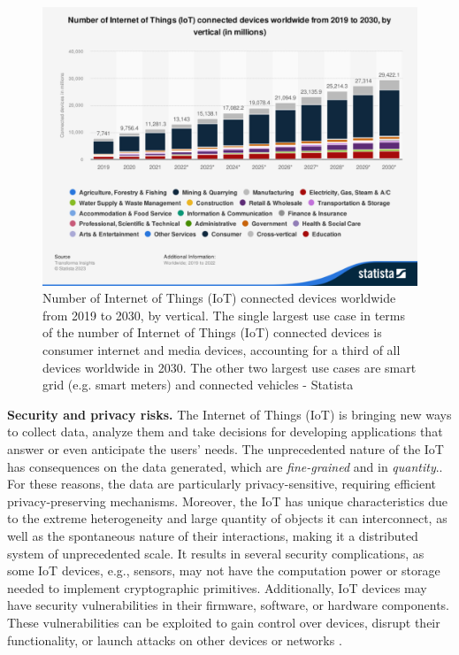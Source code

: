 \begin{figure}[t]
\centering
 \includegraphics[scale=0.4]{Images/devices_forecast.pdf}
\caption[Number of Internet of Things (IoT) connected devices worldwide from 2019 to 2030, by vertical]{Number of Internet of Things (IoT) connected devices worldwide from 2019 to 2030, by vertical. The single largest use case in terms of the number of Internet of Things (IoT) connected devices is consumer internet and media devices, accounting for a third of all devices worldwide in 2030. The other two largest use cases are smart grid (e.g. smart meters) and connected vehicles - Statista \cite{StatistaIoT2023}}
\label{F_devices_forecast}
\end{figure} 
\textbf{Security and privacy risks.}
The Internet of Things (IoT) is bringing new ways to collect data, analyze them and take decisions
for developing applications that answer or even anticipate the users’ needs. The unprecedented nature of the IoT has consequences on the data generated, which are \emph{fine-grained} and in \emph{quantity}.. For these reasons, the data are particularly
privacy-sensitive, requiring efficient privacy-preserving mechanisms. Moreover, the IoT has unique
characteristics due to the extreme heterogeneity and large quantity of objects it can interconnect, as
well as the spontaneous nature of their interactions, making it a distributed system of unprecedented
scale. It results in several security complications, as some IoT devices, e.g., sensors, may not have the computation power or storage needed to implement 
cryptographic primitives. Additionally, IoT devices may have security vulnerabilities in their firmware, software, or hardware components. These vulnerabilities can be exploited to gain control over devices, disrupt their functionality, or launch attacks on other devices or networks \cite{Omolara2022}.

